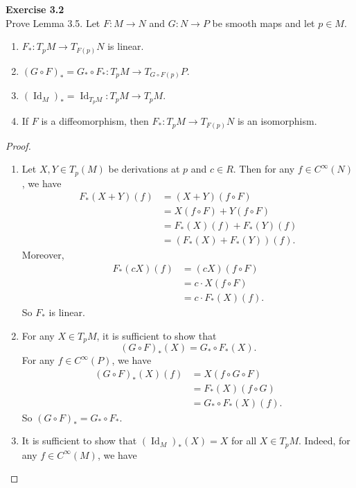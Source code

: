 \documentclass[12pt, a4paper]{article}
\theoremstyle{plain}
\DeclareMathOperator{\Id}{Id}
\newenvironment{exercise}[2][Exercise]
    { \begin{mdframed}[backgroundcolor=gray!20] \textbf{#1 #2} \\}
    {  \end{mdframed}}
\begin{document}
\begin{exercise}{3.2}
    Prove Lemma 3.5. Let $F\colon M\to N$ and $G\colon N\to P$ be smooth maps and let $p\in M$.
    \begin{enumerate}[label=(\alph*)]
        \item $F_*\colon T_pM\to T_{F(p)}N$ is linear.
        \item $(G\circ F)_*=G_*\circ F_*\colon T_pM\to T_{G\circ F(p)}P$.
        \item $(\Id_M)_*=\Id_{T_pM}\colon T_pM\to T_pM.$
        \item If $F$ is a diffeomorphism, then $F_*\colon T_pM\to T_{F(p)}N$ is an isomorphism.
    \end{enumerate}
\end{exercise}
    \begin{proof}
        \begin{enumerate}[label=(\alph*)]
            \item Let $X,Y\in T_p(M)$ be derivations at $p$ and $c\in R$. Then for any $f\in C^{\infty}(N)$, we have
            \begin{align*}
            F_*(X+Y)(f)&=(X+Y)(f\circ F)\\
            &=X(f\circ F)+Y(f\circ F)\\
            &=F_*(X)(f)+F_*(Y)(f)\\
            &=(F_*(X)+F_*(Y))(f).
            \end{align*}
            Moreover, 
            \begin{align*}
                F_*(cX)(f)&= (cX)(f\circ F)\\
                &= c\cdot X(f\circ F)\\
                &= c\cdot F_*(X)(f).
            \end{align*}
            So $F_*$ is linear.
            \item For any $X\in T_pM$, it is sufficient to show that 
            \[
            (G\circ F)_*(X)=G_*\circ F_*(X).
            \]
            For any $f\in C^{\infty}(P)$, we have
            \begin{align*}
                (G\circ F)_*(X)(f)&= X(f\circ G\circ F)\\
                &= F_*(X)(f\circ G)\\
                &= G_*\circ F_*(X)(f).
            \end{align*}
            So $(G\circ F)_*=G_*\circ F_*$.
            \item It is sufficient to show that $(\Id_M)_*(X)=X$ for all $X\in T_pM$. Indeed, for any $f\in C^\infty(M)$, we have

\end{enumerate}
\end{proof}
\end{document}

